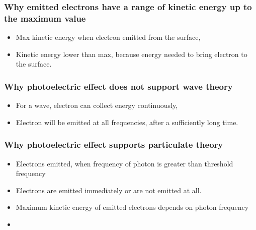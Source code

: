 \documentclass[a4paper,9pt]{scrartcl}
\begin{document}
    \subsubsection{Why emitted electrons have a range of kinetic energy up to the maximum value}
    \begin{itemize}
        \item Max kinetic energy when electron emitted from the surface,
        \item Kinetic energy lower than max, because energy needed to bring electron to the surface.
    \end{itemize}

    \subsubsection{Why photoelectric effect does not support wave theory}
    \begin{itemize}
        \item For a wave, electron can collect energy continuously,
        \item Electron will be emitted at all frequencies, after a sufficiently long time.
    \end{itemize}

    \subsubsection{Why photoelectric effect supports particulate theory}
    \begin{itemize}
        \item Electrons emitted, when frequency of photon is greater than threshold frequency
        \item Electrons are emitted immediately or are not emitted at all.
        \item Maximum kinetic energy of emitted electrons depends on photon frequency
        \item
    \end{itemize}
\end{document}
